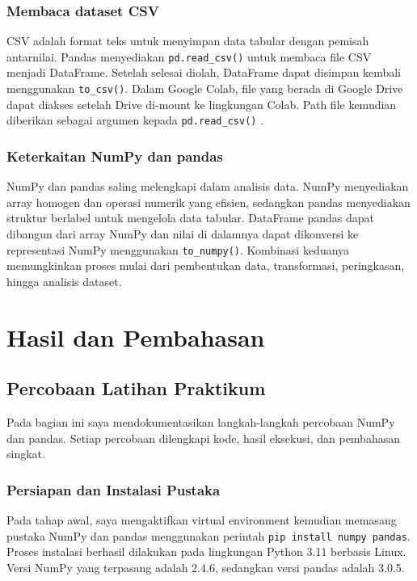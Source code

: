 \documentclass[a4paper,oneside,12pt]{report}
\newcommand{\tocboldsection}[1]{%
  \protect\renewcommand{\protect\cftchapfont}{\protect\bfseries}%
  #1%
  \protect\renewcommand{\protect\cftchapfont}{}%
}
\begin{document}
\subsection{Membaca dataset CSV}
CSV adalah format teks untuk menyimpan data tabular dengan pemisah antarnilai.
Pandas menyediakan \texttt{pd.read\_csv()} untuk membaca file CSV menjadi
DataFrame. Setelah selesai diolah, DataFrame dapat disimpan kembali menggunakan
\texttt{to\_csv()}. Dalam Google Colab, file yang berada di Google Drive dapat
diakses setelah Drive di-mount ke lingkungan Colab. Path file kemudian diberikan
sebagai argumen kepada \texttt{pd.read\_csv()} \cite{pandas-io}.

\subsection{Keterkaitan NumPy dan pandas}
NumPy dan pandas saling melengkapi dalam analisis data. NumPy menyediakan array
homogen dan operasi numerik yang efisien, sedangkan pandas menyediakan struktur
berlabel untuk mengelola data tabular. DataFrame pandas dapat dibangun dari
array NumPy dan nilai di dalamnya dapat dikonversi ke representasi NumPy
menggunakan \texttt{to\_numpy()}. Kombinasi keduanya memungkinkan proses mulai
dari pembentukan data, transformasi, peringkasan, hingga analisis dataset.

\clearpage

\chapter[\tocboldsection{Hasil dan Pembahasan}]{Hasil dan Pembahasan}

\section{Percobaan Latihan Praktikum}

Pada bagian ini saya mendokumentasikan langkah-langkah percobaan NumPy dan pandas. Setiap percobaan dilengkapi kode, hasil eksekusi, dan pembahasan singkat.

\subsection{Persiapan dan Instalasi Pustaka}
Pada tahap awal, saya mengaktifkan virtual environment kemudian memasang pustaka NumPy dan pandas menggunakan perintah \texttt{pip install numpy pandas}. Proses instalasi berhasil dilakukan pada lingkungan Python 3.11 berbasis Linux. Versi NumPy yang terpasang adalah 2.4.6, sedangkan versi pandas adalah 3.0.5.
\end{document}
